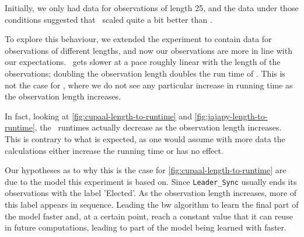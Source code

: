 Initially, we only had data for observations of length 25, and the data under those conditions suggested that \Jajapy\ scaled quite a bit better than \Cupaal.

To explore this behaviour, we extended the experiment to contain data for observations of different lengths, and now our observations are more in line with our expectations.
\Jajapy\ gets slower at a pace roughly linear with the length of the observations; doubling the observation length doubles the run time of \Jajapy.
This is not the case for \Cupaal, where we do not see any particular increase in running time as the observation length increases.

In fact, looking at \autoref{fig:cupaal-length-to-runtime} and \autoref{fig:jajapy-length-to-runtime}, the \Cupaal\ runtimes actually decrease as the observation length increases.
This is contrary to what is expected, as one would assume with more data the calculations either increase the running time or has no effect.

Our hypotheses as to why this is the case for \autoref{fig:cupaal-length-to-runtime} are due
to the model this experiment is based on. Since \texttt{Leader\_Sync} usually ends its observations with the label 'Elected'.
As the observation length increases, more of this label appears in sequence.
Leading the \gls{bw} algorithm to learn the final part of the model faster and, at a certain point, reach a constant value that it can reuse in future computations, leading to part of the model being learned with
faster.


